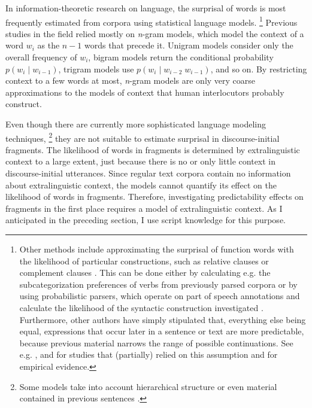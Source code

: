 In information-theoretic research on language, the surprisal of words is most frequently estimated from corpora using statistical language models.%
%
\footnote{Other methods include approximating the surprisal of function words with the likelihood of particular constructions, such as relative clauses \citep{levy.jaeger2007} or complement clauses \citep{jaeger2010}. This can be done either by calculating e.g. the subcategorization preferences of verbs from previously parsed corpora \citep{jaeger2010} or by using probabilistic parsers, which operate on part of speech annotations and calculate the likelihood of the syntactic construction investigated \citep{levy.jaeger2007}. Furthermore, other authors have simply stipulated that, everything else being equal, expressions that occur later in a sentence or text are more predictable, because previous material narrows the range of possible continuations. See e.g. \citet{fenk-oczlon1989}, \citet{fenk-oczlon1990} and \citet{genzel.charniak2002} for studies that (partially) relied on this assumption and \citet[1147]{levy2008} for empirical evidence.
}\afterfn%
%
Previous studies in the field relied mostly on \textit{n}-gram models, which model the context of a word $w_{i}$ as the $n-1$ words that precede it. Unigram models consider only the overall frequency of $w_{i}$, bigram models return the conditional probability $p(w_i \mathbin{|} w_{i-1})$, trigram models use  $p(w_i \mathbin{|} w_{i-2}\; w_{i-1})$, and so on. By restricting context to a few words at most, \textit{n}-gram models are only very coarse approximations to the models of context that human interlocutors probably construct.

Even though there are currently more sophisticated language modeling techniques,%
%
\footnote{Some models take into account hierarchical structure \citep{stolcke1995, hale2001,roark2001, levy2008} or even material contained in previous sentences \citep{iyer.ostendorf1996, oualil.etal2016, oualil.etal2017, singh.etal2016a, grave.etal2017, khandelwal.etal2018, devlin.etal2019}.}\afterfn%
%
they are not suitable to estimate surprisal in discourse-initial fragments. The likelihood of words in fragments is determined by extralinguistic context to a large extent, just because there is no or only little context in discourse-initial utterances. Since regular text corpora contain no information about extralinguistic context, the models cannot quantify its effect on the likelihood of words in fragments. Therefore, investigating predictability effects on fragments in the first place requires a model of extralinguistic context. As I anticipated in the preceding section, I use script knowledge for this purpose.

